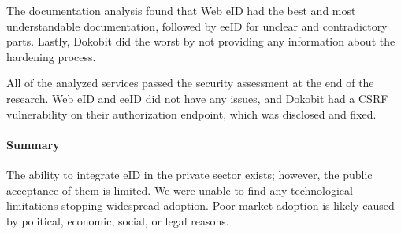 The documentation analysis found that Web eID had the best and most understandable documentation, followed by eeID for unclear and contradictory parts. Lastly, Dokobit did the worst by not providing any information about the hardening process.

All of the analyzed services passed the security assessment at the end of the research. Web eID and eeID did not have any issues, and Dokobit had a CSRF vulnerability on their authorization endpoint, which was disclosed and fixed.

\paragraph{Summary} The ability to integrate eID in the private sector exists; however, the public acceptance of them is limited. We were unable to find any technological limitations stopping widespread adoption. Poor market adoption is likely caused by political, economic, social, or legal reasons.